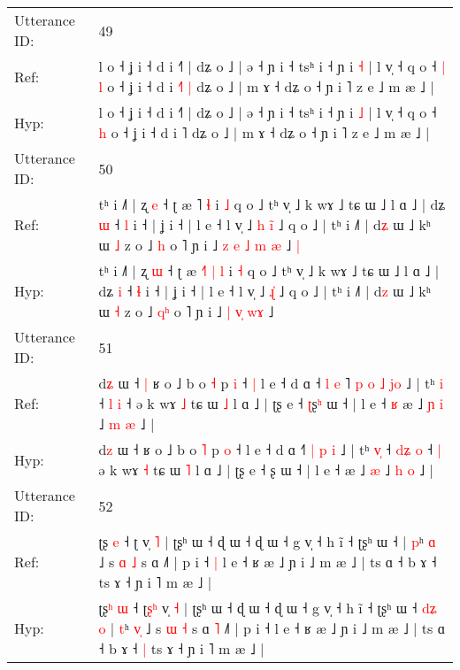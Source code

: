\documentclass[10pt]{article}
\DeclareRobustCommand{\hl}[1]{{\textcolor{red}{#1}}}
\begin{document}
\begin{longtable}{ll}
Utterance ID: & 49 \\
Ref: & l o ˧ ʝ i ˧ d i ˧˥ | dʑ o ˩ | ə ˧ ɲ i ˧ tsʰ i ˧ ɲ i \hl{˧} | l v̩ ˧ q o ˧\hl{ }\hl{|} \hl{l} o ˧ ʝ i ˧ d i \hl{˧}˥\hl{ }\hl{|} dʑ o ˩ | m ɤ ˧ dʑ o ˧ ɲ i ˥ z e ˩ m æ ˩ |
 \\
Hyp: & l o ˧ ʝ i ˧ d i ˧˥ | dʑ o ˩ | ə ˧ ɲ i ˧ tsʰ i ˧ ɲ i \hl{˩} | l v̩ ˧ q o ˧\hl{}\hl{} \hl{h} o ˧ ʝ i ˧ d i \hl{}˥\hl{}\hl{} dʑ o ˩ | m ɤ ˧ dʑ o ˧ ɲ i ˥ z e ˩ m æ ˩ |
 \\
\midrule
Utterance ID: & 50 \\
Ref: & tʰ i ˩˥ | ʐ \hl{e} ˧ ʈ æ \hl{}˥\hl{}\hl{} \hl{ɬ} i \hl{˩} q o ˩ tʰ v̩ ˩ k wɤ ˩ tɕ ɯ ˩ l ɑ ˩ | dʑ \hl{ɯ} ˧ \hl{l} i ˧ | ʝ i ˧ | l e ˧ l v̩ ˩\hl{ }\hl{h} \hl{i}\hl{̃} ˩ q o ˩ | tʰ i ˩˥ | d\hl{ʑ} ɯ ˩ kʰ ɯ \hl{˩} z o ˩ \hl{}\hl{h} o ˥ ɲ i ˩ \hl{z} \hl{e}\hl{ }\hl{˩} \hl{m}\hl{ }\hl{æ} ˩\hl{ }\hl{|}
 \\
Hyp: & tʰ i ˩˥ | ʐ \hl{ɯ} ˧ ʈ æ \hl{˧}˥\hl{ }\hl{|} \hl{l} i \hl{˧} q o ˩ tʰ v̩ ˩ k wɤ ˩ tɕ ɯ ˩ l ɑ ˩ | dʑ \hl{i} ˧ \hl{ɬ} i ˧ | ʝ i ˧ | l e ˧ l v̩ ˩\hl{}\hl{} \hl{ɻ}\hl{̍} ˩ q o ˩ | tʰ i ˩˥ | d\hl{z} ɯ ˩ kʰ ɯ \hl{˧} z o ˩ \hl{q}\hl{ʰ} o ˥ ɲ i ˩ \hl{|} \hl{}\hl{v}\hl{̩} \hl{}\hl{w}\hl{ɤ} ˩\hl{}\hl{}
 \\
\midrule
Utterance ID: & 51 \\
Ref: & d\hl{ʑ} ɯ ˧\hl{ }\hl{|} ʁ o ˩ b o \hl{˧} p \hl{i} ˧\hl{ }\hl{|} l e ˧ d ɑ ˧\hl{ }\hl{l}\hl{ }\hl{e}\hl{ }˥\hl{ }\hl{p} \hl{o} \hl{˩} \hl{j}\hl{o} ˩ | tʰ \hl{}\hl{i} ˧ \hl{}\hl{l} \hl{i} ˧\hl{}\hl{} ə k wɤ \hl{˩} tɕ ɯ \hl{˩} l ɑ ˩ | ʈʂ e ˧ \hl{ʈ}ʂ\hl{ʰ} ɯ ˧ | l e ˧\hl{ }\hl{ʁ} æ ˩\hl{ }\hl{ɲ} \hl{i} ˩ \hl{m} \hl{æ} ˩ |
 \\
Hyp: & d\hl{z} ɯ ˧\hl{}\hl{} ʁ o ˩ b o \hl{˥} p \hl{o} ˧\hl{}\hl{} l e ˧ d ɑ ˧\hl{}\hl{}\hl{}\hl{}\hl{}˥\hl{}\hl{} \hl{|} \hl{p} \hl{}\hl{i} ˩ | tʰ \hl{v}\hl{̩} ˧ \hl{d}\hl{ʑ} \hl{o} ˧\hl{ }\hl{|} ə k wɤ \hl{˧} tɕ ɯ \hl{˥} l ɑ ˩ | ʈʂ e ˧ \hl{}ʂ\hl{} ɯ ˧ | l e ˧\hl{}\hl{} æ ˩\hl{}\hl{} \hl{æ} ˩ \hl{h} \hl{o} ˩ |
 \\
\midrule
Utterance ID: & 52 \\
Ref: & ʈʂ\hl{} \hl{e} ˧ ʈ\hl{}\hl{} v̩ \hl{˥} | ʈʂʰ ɯ ˧ ɖ ɯ ˧ ɖ ɯ ˧ g v̩ ˧ h ĩ ˧ ʈʂʰ ɯ ˧\hl{}\hl{}\hl{}\hl{}\hl{} | \hl{p}ʰ \hl{}\hl{ɑ} ˩ s \hl{ɑ} \hl{˩} s ɑ\hl{}\hl{} ˩˥ | p i ˧\hl{ }\hl{|} l e ˧ ʁ æ ˩ ɲ i ˩ m æ ˩ | ts ɑ ˧ b ɤ ˧\hl{}\hl{} ts ɤ ˧ ɲ i ˥ m æ ˩ |
 \\
Hyp: & ʈʂ\hl{ʰ} \hl{ɯ} ˧ ʈ\hl{ʂ}\hl{ʰ} v̩ \hl{˧} | ʈʂʰ ɯ ˧ ɖ ɯ ˧ ɖ ɯ ˧ g v̩ ˧ h ĩ ˧ ʈʂʰ ɯ ˧\hl{ }\hl{d}\hl{ʑ}\hl{ }\hl{o} | \hl{t}ʰ \hl{v}\hl{̩} ˩ s \hl{ɯ} \hl{˧} s ɑ\hl{ }\hl{˥} ˩˥ | p i ˧\hl{}\hl{} l e ˧ ʁ æ ˩ ɲ i ˩ m æ ˩ | ts ɑ ˧ b ɤ ˧\hl{ }\hl{|} ts ɤ ˧ ɲ i ˥ m æ ˩ |

\end{longtable}
\end{document}
